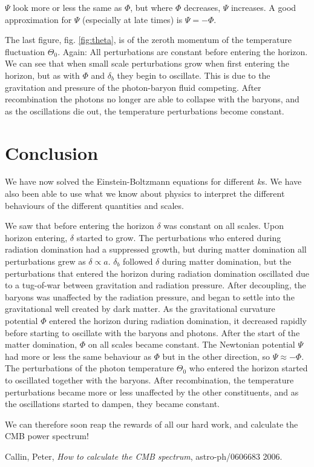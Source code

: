 \documentclass[a4paper,norsk, 10pt]{article}
\begin{document}
$\Psi$ look more or less the same as $\Phi$, but where $\Phi$ decreases, $\Psi$ increases. A good approximation for $\Psi$ (especially at late times) is $\Psi = - \Phi$.

The last figure, fig. \ref{fig:theta}, is of the zeroth momentum of the temperature fluctuation $\Theta_0$. Again: All perturbations are constant before entering the horizon. We can see that when small scale perturbations grow when first entering the horizon, but as with $\Phi$ and $\delta_b$ they begin to oscillate. This is due to the gravitation and pressure of the photon-baryon fluid competing. After recombination the photons no longer are able to collapse with the baryons, and as the oscillations die out, the temperature perturbations become constant.


\newpage


\section{Conclusion}
We have now solved the Einstein-Boltzmann equations for different $k$s. We have also been able to use what we know about physics to interpret the different behaviours of the different quantities and scales. 

We saw that before entering the horizon $\delta$ was constant on all scales. Upon horizon entering, $\delta$ started to grow. The perturbations who entered during radiation domination had a suppressed growth, but during matter domination all perturbations grew as $\delta \propto a$. $\delta_b$ followed $\delta$ during matter domination, but the perturbations that entered the horizon during radiation domination oscillated due to a tug-of-war between gravitation and radiation pressure. After decoupling, the baryons was unaffected by the radiation pressure, and began to settle into the gravitational well created by dark matter.
As the gravitational curvature potential $\Phi$ entered the horizon during radiation domination, it decreased rapidly before starting to oscillate with the baryons and photons. After the start of the matter domination, $\Phi$ on all scales became constant. The Newtonian potential $\Psi$ had more or less the same behaviour as $\Phi$ but in the other direction, so $\Psi \approx -\Phi$.
The perturbations of the photon temperature $\Theta_0$ who entered the horizon started to oscillated together with the baryons. After recombination, the temperature perturbations became more or less unaffected by the other constituents, and as the oscillations started to dampen, they became constant.

We can therefore soon reap the rewards of all our hard work, and calculate the CMB power spectrum!





\begin{thebibliography}{9}

  Callin, Peter,
  \textit{How to calculate the CMB spectrum},
  astro-ph/0606683
  2006.

\end{thebibliography}
\end{document}
